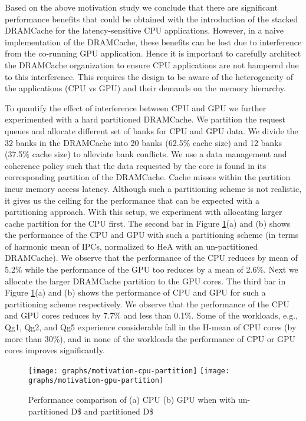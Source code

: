 \par Based on the above motivation study we conclude that there are significant performance benefits that could be obtained 
with the introduction of the stacked DRAMCache for the latency-sensitive CPU applications. However, in a naive implementation
of the DRAMCache, these benefits can be lost due to interference from the co-running GPU application.  Hence it is important to carefully 
architect the DRAMCache organization to ensure CPU applications are not hampered due to this interference.
This requires the design to be aware of the heterogeneity of the applications (CPU vs GPU) and their demands on the 
memory hierarchy.  
\par To quantify the effect of interference between CPU and GPU we further experimented with a hard partitioned DRAMCache. We partition the request queues and allocate different set of banks for CPU and GPU data. We divide the 32 banks in the DRAMCache into 20 banks (62.5\% cache size) and 12 banks (37.5\% cache size) to alleviate bank conflicts. We use a data management and coherence policy such that the data requested by the core is found in its corresponding partition of the DRAMCache. Cache misses within the partition incur memory access latency. Although such a partitioning scheme is not realistic, it gives us the ceiling for the performance that can be expected with a partitioning approach. With this setup, we experiment with allocating larger cache partition for the CPU first. The second bar in Figure \ref{fig:motivation-partition}(a) and (b) shows the performance of the CPU and GPU with such a partitioning scheme (in terms of harmonic mean of IPCs, normalized to HeA with an un-partitioned DRAMCache). We observe that the performance of the CPU reduces by mean of 5.2\% while the performance of the GPU too reduces by a mean of 2.6\%.
Next we allocate the larger DRAMCache partition to the GPU cores. The third bar in Figure \ref{fig:motivation-partition}(a) and (b) shows the performance of CPU and GPU for such a partitioning scheme respectively. We observe that the performance of the CPU and GPU cores reduces by 7.7\% and less than 0.1\%. Some of the workloads, e.g., Qg1, Qg2, and Qg5 experience considerable fall in the H-mean of CPU cores (by more than 30\%), and in none of the workloads the performance of CPU or GPU cores improves significantly.
\begin{figure}[htbp]
	\centering
	\texttt{[image: graphs/motivation-cpu-partition]}
	\texttt{[image: graphs/motivation-gpu-partition]}
	\caption{Performance comparison of (a) CPU (b) GPU when with un-partitioned D\$ and partitioned D\$}
	\label{fig:motivation-partition}
\end{figure}
